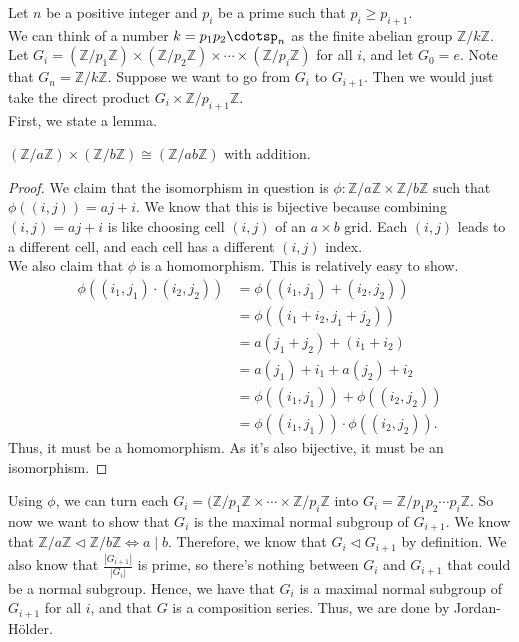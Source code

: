 \documentclass{scrartcl}
\begin{document}
\begin{soln}
	Let $n$ be a positive integer and $p_i$ be a prime such that $p_i \ge p_{i+1}$. \\
	We can think of a number $k = p_1p_2\cdotsp_n$ as the finite abelian group $\mathbb{Z} / k \mathbb{Z}$. Let $G_i = (\mathbb{Z}/p_1\mathbb{Z}) \times (\mathbb{Z}/p_2\mathbb{Z}) \times \cdots \times (\mathbb{Z}/p_i\mathbb{Z})$ for all $i$, and let $G_0 = e$. Note that $G_n = \mathbb{Z}/k\mathbb{Z}$. Suppose we want to go from $G_i$ to $G_{i+1}$. Then we would just take the direct product $G_i \times \mathbb{Z}/p_{i+1}\mathbb{Z}$. \\
	First, we state a lemma.
	\begin{lemma}
		$(\mathbb{Z}/a\mathbb{Z}) \times (\mathbb{Z}/b\mathbb{Z}) \cong (\mathbb{Z}/ab\mathbb{Z})$ with addition.
	\end{lemma}
	\begin{proof}
		We claim that the isomorphism in question is $\phi : \mathbb{Z}/a\mathbb{Z} \times \mathbb{Z}/b\mathbb{Z}$ such that $\phi((i,j)) = aj+i$. We know that this is bijective because combining $(i, j) = aj+i$ is like choosing cell $(i, j)$ of an $a \times b$ grid. Each $(i, j)$ leads to a different cell, and each cell has a different $(i, j)$ index. \\
		We also claim that $\phi$ is a homomorphism. This is relatively easy to show.
		\begin{align*}
			\phi((i_1, j_1) \cdot (i_2, j_2)) &= \phi((i_1, j_1) + (i_2, j_2)) \\
			&= \phi((i_1+i_2, j_1+j_2)) \\
			&= a(j_1+j_2) + (i_1+i_2) \\
			&= a(j_1) + i_1 + a(j_2) + i_2 \\
			&= \phi((i_1, j_1)) + \phi((i_2, j_2)) \\
			&= \phi((i_1, j_1)) \cdot \phi((i_2, j_2)).
		\end{align*}
		Thus, it must be a homomorphism. As it's also bijective, it must be an isomorphism.
	\end{proof}
	Using $\phi$, we can turn each $G_i = (\mathbb{Z}/p_1\mathbb{Z} \times \cdots \times \mathbb{Z}/p_i\mathbb{Z}$ into $G_i = \mathbb{Z}/p_1p_2\cdots p_i\mathbb{Z}$.
	So now we want to show that $G_i$ is the maximal normal subgroup of $G_{i+1}$. We know that $\mathbb{Z}/a\mathbb{Z} \lhd \mathbb{Z}/b\mathbb{Z} \iff a \mid b$. Therefore, we know that $G_i \lhd G_{i+1}$ by definition. We also know that $\frac{|G_{i+1}|}{|G_i|}$ is prime, so there's nothing between $G_i$ and $G_{i+1}$ that could be a normal subgroup. Hence, we have that $G_i$ is a maximal normal subgroup of $G_{i+1}$ for all $i$, and that $G$ is a composition series. Thus, we are done by Jordan-Hölder.
\end{soln}
\end{document}
